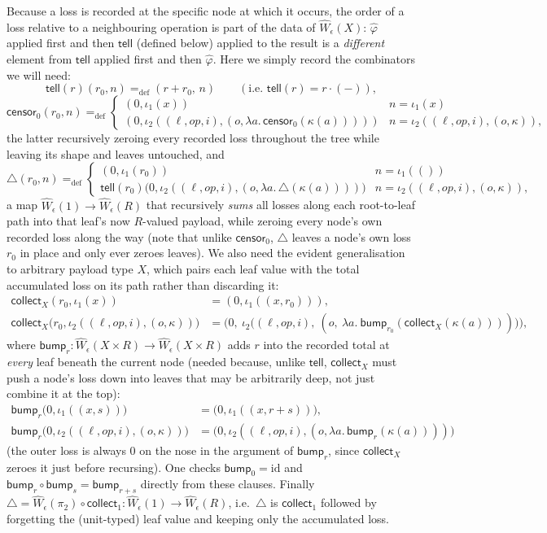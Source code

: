 \documentclass[11pt]{article}
\theoremstyle{plain}
\newcommand{\Wm}[1]{\widehat{W}_{#1}}
\newcommand{\eps}{\epsilon}
\newcommand{\op}{\mathit{op}}
\newcommand{\tell}{\mathsf{tell}}
\newcommand{\censor}{\mathsf{censor}_0}
\newcommand{\collect}{\triangle}
\newcommand{\collectX}[1]{\mathsf{collect}_{#1}}
\newcommand{\bump}{\mathsf{bump}}
\begin{document}
Because a loss is recorded at the specific node at which it occurs, the order of a loss
relative to a neighbouring operation is part of the data of $\Wm\eps(X)$: $\widehat\varphi$
applied first and then $\tell$ (defined below) applied to the result is a \emph{different}
element from $\tell$ applied first and then $\widehat\varphi$. Here we simply record the
combinators we will need:
\[
  \tell(r)(r_0,n) =_{\mathrm{def}} (r+r_0,\,n) \qquad(\text{i.e. } \tell(r) = r\cdot(-)),
\]
\[
  \censor(r_0,n) =_{\mathrm{def}}
  \begin{cases}
    (0,\iota_1(x)) & n=\iota_1(x)\\
    (0,\iota_2((\ell,\op,i),(o,\lambda a.\,\censor(\kappa(a))))) & n=\iota_2((\ell,\op,i),(o,\kappa)),
  \end{cases}
\]
the latter recursively zeroing every recorded loss throughout the tree while leaving its
shape and leaves untouched, and
\[
  \collect(r_0,n) =_{\mathrm{def}}
  \begin{cases}
    (0,\iota_1(r_0)) & n = \iota_1(())\\
    \tell(r_0)\big(0,\iota_2((\ell,\op,i),(o,\lambda a.\,\collect(\kappa(a))))\big) & n = \iota_2((\ell,\op,i),(o,\kappa)),
  \end{cases}
\]
a map $\Wm\eps(1)\to \Wm\eps(R)$ that recursively \emph{sums} all losses along
each root-to-leaf path into that leaf's now $R$-valued payload, while zeroing every node's own
recorded loss along the way (note that unlike $\censor$, $\collect$ leaves a node's own loss
$r_0$ in place and only ever zeroes leaves). We also need the evident generalisation to
arbitrary payload type $X$, which pairs each leaf value with the total accumulated loss on
its path rather than discarding it:
\begin{align*}
  \collectX X(r_0,\iota_1(x)) &= (0,\iota_1((x,r_0))), \\
  \collectX X\big(r_0,\iota_2((\ell,\op,i),(o,\kappa))\big)
     &= \Big(0,\ \iota_2\big((\ell,\op,i),\ (o,\ \lambda a.\ \bump_{r_0}(\collectX X(\kappa(a))))\big)\Big),
\end{align*}
where $\bump_r : \Wm\eps(X\times R)\to\Wm\eps(X\times R)$ adds $r$ into the
recorded total at \emph{every} leaf beneath the current node (needed because, unlike $\tell$,
$\collectX X$ must push a node's loss down into leaves that may be arbitrarily deep, not just
combine it at the top):
\begin{align*}
  \bump_r\big(0,\iota_1((x,s))\big) &= \big(0,\iota_1((x,r+s))\big), \\
  \bump_r\big(0,\iota_2((\ell,\op,i),(o,\kappa))\big) &= \big(0,\iota_2((\ell,\op,i),(o,\lambda a.\,\bump_r(\kappa(a))))\big)
\end{align*}
(the outer loss is always $0$ on the nose in the argument of $\bump_r$, since $\collectX X$
zeroes it just before recursing). One checks $\bump_0 = \mathrm{id}$ and
$\bump_r\circ\bump_s = \bump_{r+s}$ directly from these clauses. Finally
$\collect = \Wm\eps(\pi_2)\circ\collectX 1 : \Wm\eps(1)\to\Wm\eps(R)$, i.e.\
$\collect$ is $\collectX 1$ followed by forgetting the (unit-typed) leaf value and keeping only
the accumulated loss.
\end{document}
